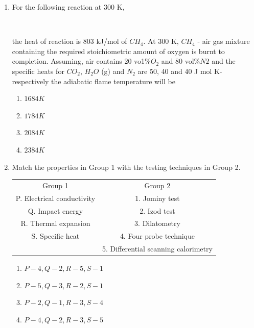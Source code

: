 \documentclass[journal]{IEEEtran}
\theoremstyle{remark}
\begin{document}
\begin{enumerate}
\item  For the following reaction at 300 K,\\
\begin{center}
    

\\
\end{center}
the heat of reaction is 803 kJ/mol of $CH_4$. At 300 K, $CH_4$ - air gas mixture containing the required stoichiometric amount of oxygen is burnt to completion. Assuming, air contains 20 vo1$\% O_2$ and
80 vol$\% N2$ and the specific heats for $CO_2$, $H_2O$ (g) and $N_2$ are 50, 40 and 40 J mol K- respectively the adiabatic flame temperature will be
 \hfill{}
\begin{multicols}{4}
\begin{enumerate}
\item  $1684 K$
\item $1784 K$
\item  $2084 K$
\item  $2384 K$
\end{enumerate}
\end{multicols}

\item   Match the properties in Group 1 with the testing techniques in Group 2.
\hfill{}
\begin{center}
    \begin{tabular}{c c}
    Group 1     &Group 2  \\
   P. Electrical conductivity      & 1. Jominy test\\
   Q. Impact energy &2. Izod test\\
   R. Thermal expansion&3. Dilatometry\\
   S. Specific heat&4. Four probe technique\\
     &5. Differential scanning calorimetry


    \end{tabular}
\end{center}
\begin{multicols}{2}
\begin{enumerate}   
\item $P-4, Q-2, R-5, S-1$
\item $P-5, Q-3, R-2, S-1$
\item  $P-2, Q-1, R-3, S-4$
\item  $P-4, Q-2, R-3, S-5$
\end{enumerate}
\end{multicols}


\end{enumerate}
\end{document}
